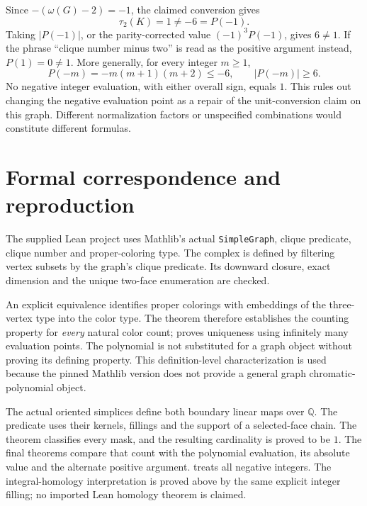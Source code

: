 \documentclass[11pt]{article}
\newcommand{\Q}{\mathbb Q}
\begin{document}
Since $-(\omega(G)-2)=-1$, the claimed conversion gives
\[
\boxed{\tau_2(K)=1\ne-6=P(-1).}
\]
Taking $|P(-1)|$, or the parity-corrected value $(-1)^3P(-1)$, gives
$6\ne1$. If the phrase ``clique number minus two'' is read as the
positive argument instead, $P(1)=0\ne1$.
More generally, for every integer $m\geq1$,
\[
P(-m)=-m(m+1)(m+2)\leq-6,\qquad |P(-m)|\geq6.
\]
No negative integer evaluation, with either overall sign, equals $1$.
This rules out changing the negative evaluation point as a repair of
the unit-conversion claim on this graph. Different normalization factors
or unspecified combinations would constitute different formulas.

\section*{Formal correspondence and reproduction}
The supplied Lean project uses Mathlib's actual \texttt{SimpleGraph},
clique predicate, clique number and proper-coloring type.
The complex is defined by filtering vertex subsets by the graph's
clique predicate. Its downward closure, exact dimension and the unique
two-face enumeration are checked.

An explicit equivalence identifies proper colorings with embeddings of
the three-vertex type into the color type. The theorem
 therefore establishes the counting property for
\emph{every} natural color count;  proves uniqueness
using infinitely many evaluation points. The polynomial is not substituted
for a graph object without proving its defining property. This definition-level
characterization is used because the pinned Mathlib version does not provide
a general graph chromatic-polynomial object.

The actual oriented simplices define both boundary linear maps over $\Q$.
The predicate  uses their kernels, fillings and
the support of a selected-face chain. The theorem 
classifies every mask, and the resulting cardinality is proved to be $1$.
The final theorems compare that count with the polynomial evaluation,
its absolute value and the alternate positive argument.
 treats all negative integers.
The integral-homology interpretation is proved above by the same explicit
integer filling; no imported Lean homology theorem is claimed.
\end{document}
